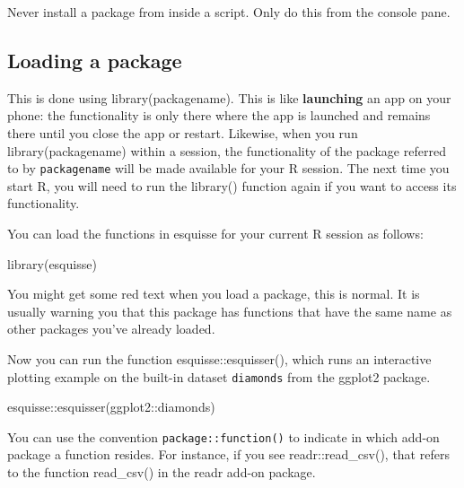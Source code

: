 \documentclass[
  oneside]{book}
\newenvironment{Shaded}{\begin{snugshade}}{\end{snugshade}}
\newcommand{\FunctionTok}[1]{\textcolor[rgb]{0.00,0.00,0.00}{#1}}
\newcommand{\NormalTok}[1]{#1}
\newcommand{\SpecialCharTok}[1]{\textcolor[rgb]{0.00,0.00,0.00}{#1}}
\begin{document}
\begin{dangerous}
Never install a package from inside a script. Only do this from the console pane.

\end{dangerous}

\hypertarget{loading-a-package}{%
\subsection{Loading a package}\label{loading-a-package}}

This is done using {library}{(}{packagename}{)}. This is like \textbf{launching} an app on your phone: the functionality is only there where the app is launched and remains there until you close the app or restart. Likewise, when you run {library}{(}{packagename}{)} within a session, the functionality of the package referred to by \texttt{packagename} will be made available for your R session. The next time you start R, you will need to run the {library}{(}{)} function again if you want to access its functionality.

You can load the functions in esquisse for your current R session as follows:

\begin{Shaded}
\begin{Highlighting}[]
\FunctionTok{library}\NormalTok{(esquisse)}
\end{Highlighting}
\end{Shaded}

You might get some red text when you load a package, this is normal. It is usually warning you that this package has functions that have the same name as other packages you've already loaded.

Now you can run the function {esquisse}{::}{esquisser}{(}{)}, which runs an interactive plotting example on the built-in dataset \texttt{diamonds} from the ggplot2 package.

\begin{Shaded}
\begin{Highlighting}[]
\NormalTok{esquisse}\SpecialCharTok{::}\FunctionTok{esquisser}\NormalTok{(ggplot2}\SpecialCharTok{::}\NormalTok{diamonds)}
\end{Highlighting}
\end{Shaded}

\begin{info}
You can use the convention \texttt{package::function()} to indicate in which add-on package a function resides. For instance, if you see {readr}{::}{read\_csv}{(}{)}, that refers to the function {read\_csv}{(}{)} in the readr add-on package.

\end{info}
\end{document}
